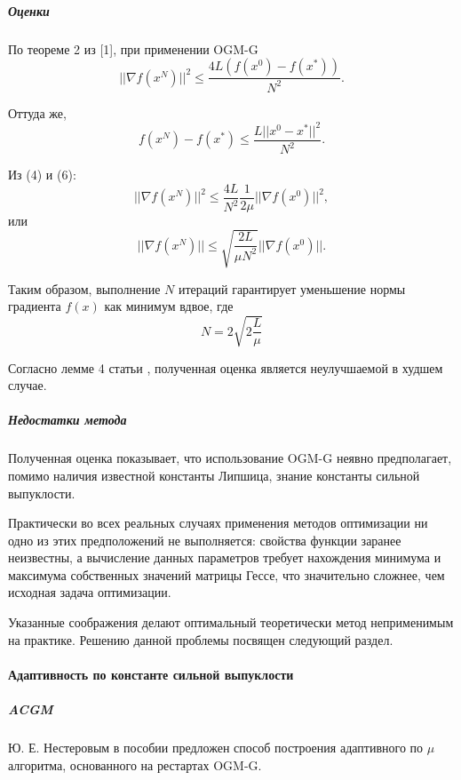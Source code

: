 \documentclass{crm-article}
\begin{document}
\subparagraph{Оценки}

По теореме 2 из [1], при применении OGM-G
\begin{equation}
||\nabla f(x^N)||^2\leq \frac{4L(f(x^0)-f(x^*))}{N^2}.
\end{equation}

Оттуда же,
\begin{equation}
f(x^N)-f(x^*)\leq \frac{L||x^0-x^*||^2}{N^2}.
\end{equation}

Из (4) и (6):
\begin{equation}
||\nabla f(x^N)||^2\leq \frac{4L}{N^2}\frac{1}{2\mu}||\nabla f(x^0)||^2,
\end{equation}
или
\begin{equation}
||\nabla f(x^N)||\leq \sqrt{\frac{2L}{\mu N^2}}||\nabla f(x^0)||.
\end{equation}

Таким образом, выполнение $N$ итераций гарантирует уменьшение нормы градиента $f(x)$ как минимум вдвое, где
\begin{equation}
    N=2\sqrt{2\frac{L}{\mu}}
\end{equation}

Согласно лемме 4 статьи \cite{kim2018fessler}, полученная оценка является неулучшаемой в худшем случае.

\subparagraph{Недостатки метода}

Полученная оценка показывает, что использование OGM-G неявно предполагает, помимо наличия известной константы Липшица, знание константы сильной выпуклости.

Практически во всех реальных случаях применения методов оптимизации ни одно из этих предположений не выполняется: свойства функции заранее неизвестны, а вычисление данных параметров требует нахождения минимума и максимума собственных значений матрицы Гессе, что значительно сложнее, чем исходная задача оптимизации.

Указанные соображения делают оптимальный теоретически метод неприменимым на практике. Решению данной проблемы посвящен следующий раздел.

\paragraph{Адаптивность по константе сильной выпуклости}

\subparagraph{ACGM}

Ю. Е. Нестеровым в пособии \cite{gasnikov2017universal} предложен способ построения адаптивного по $\mu$ алгоритма, основанного на рестартах OGM-G.
\end{document}
